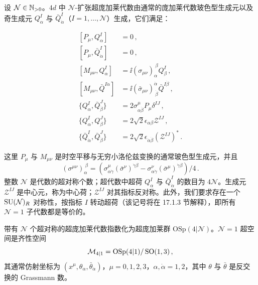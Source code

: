 \begin{definition}[17.1] 设 $\mathcal{N}\in\mathbb{N}_{>0}$。$4d$ 中 $\mathcal{N}$-扩张超庞加莱代数由通常的庞加莱代数玻色型生成元以及奇生成元 $Q^I_\alpha$ 与 $\bar Q^I_{\dot\alpha}$（$I=1,\dots,\mathcal{N}$）生成，它们满足：

\begin{equation}
\begin{aligned}
[P_\mu,Q^I_\alpha]&=0\,,\\
[P_\mu,\bar Q^I_{\dot\alpha}]&=0\,,\\
[M_{\mu\nu},Q^I_\alpha]&=\ii(\sigma_{\mu\nu})_\alpha^{\ \beta}Q^I_\beta\,,\\
[M_{\mu\nu},\bar Q^{I\dot\alpha}]&=\ii(\bar\sigma_{\mu\nu})^{\dot\alpha}_{\ \dot\beta}\bar Q^{I\dot\beta}\,,\\
\{Q^I_\alpha,\bar Q^J_{\dot\beta}\}&=2\sigma^\mu_{\alpha\dot\beta}P_\mu\delta^{IJ}\,,\\
\{Q^I_\alpha,Q^J_\beta\}&=2\sqrt{2}\epsilon_{\alpha\beta}\mathcal{Z}^{IJ}\,,\\
\{\bar Q^I_{\dot\alpha},\bar Q^J_{\dot\beta}\}&=2\sqrt{2}\epsilon_{\dot\alpha\dot\beta}\left(\mathcal{Z}^{IJ}\right)^*\,.
\end{aligned}
\tag{17.1}
\end{equation}
\end{definition}

这里 $P_\mu$ 与 $M_{\mu\nu}$ 是时空平移与无穷小洛伦兹变换的通常玻色型生成元，并且
\[
(\sigma^{\mu\nu})_\alpha^{\ \beta}=\left(\sigma^\mu_{\alpha\dot\gamma}(\bar\sigma^\nu)^{\dot\gamma\beta}-\sigma^\nu_{\alpha\dot\gamma}(\bar\sigma^\mu)^{\dot\gamma\beta}\right)/4\,.
\]
整数 $\mathcal{N}$ 是代数的超对称个数；超代数中超荷 $Q^I_\alpha$ 与 $\bar Q^I_{\dot\alpha}$ 的数目为 $4\mathcal{N}$。生成元 $\mathcal{Z}^{IJ}$ 是中心元，称为中心荷；$\mathcal{Z}^{IJ}$ 对其指标反对称。此外，我们要求存在一个 $\operatorname{SU}(\mathcal{N})_R$ 对称性，按指标 $I$ 转动超荷（该记号将在 17.1.3 节解释），即所有 $\mathcal{N}=1$ 子代数都是等价的。

带有 $\mathcal{N}$ 个超对称的超庞加莱代数指数化为超庞加莱群 $\mathrm{OSp}(4|\mathcal{N})$。$\mathcal{N}=1$ 超空间是齐性空间
\[
\mathcal{M}_{4|1}=\mathrm{OSp}(4|1)/\operatorname{SO}(1,3)\,,
\]
其通常仿射坐标为 $(x^\mu,\theta_\alpha,\bar\theta_{\dot\alpha})$，$\mu=0,1,2,3$，$\alpha,\dot\alpha=1,2$，其中 $\theta$ 与 $\bar\theta$ 是反交换的 Grassmann 数。

